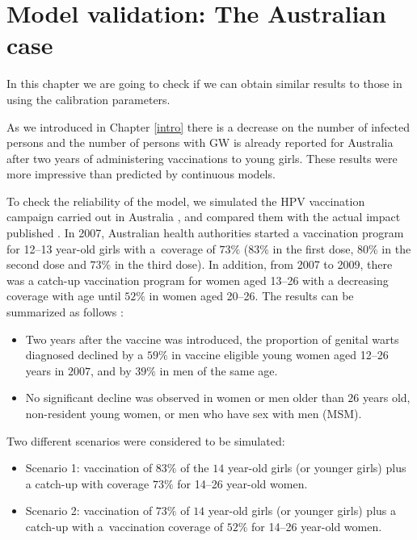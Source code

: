 \chapter{Model validation: The Australian case}\label{Australiano}

In this chapter we are going to check if we can obtain similar results to those in \cite{ali2013genital,fairley2009rapid} using the calibration parameters.

As we introduced in Chapter \ref{intro} \cite{ali2013genital} there is a decrease on the number of infected persons and the number of persons with GW is already reported for Australia after two years of administering vaccinations to young girls. These results were more impressive than predicted by continuous models.

To check the reliability of the model, we simulated the HPV vaccination campaign carried out in Australia \cite{ali2013genital}, and compared them with the actual impact published \cite{ali2013genital}. In 2007, Australian health authorities started a vaccination program for 12--13 year-old girls with a~coverage of $73\%$ ($83\%$ in the first dose, $80\%$ in the second dose and $73\%$ in the third dose). In addition, from 2007 to 2009, there was a catch-up vaccination program for women aged 13--26 with a decreasing coverage with age until $52\%$ in women aged 20--26. The results can be summarized as follows \cite{ali2013genital}:

\begin{itemize}
	\item Two years after the vaccine was introduced, the proportion of genital warts diagnosed declined by a $59\%$ in vaccine eligible young women aged 12--26 years in $2007$, and by $39\%$ in men of the same age.
	\item No significant decline was observed in women or men older than $26$ years old, non-resident young women, or men who have sex with men (MSM).
\end{itemize}

Two different scenarios were considered to be simulated:

\begin{itemize}
	\item Scenario 1: vaccination of $83\%$ of the $14$ year-old girls (or younger girls) plus a catch-up with coverage $73\%$ for 14--26 year-old women.
	\item Scenario 2: vaccination of $73\%$ of $14$ year-old girls (or younger girls) plus a catch-up with a~vaccination coverage of $52\%$ for 14--26 year-old women.
\end{itemize}

